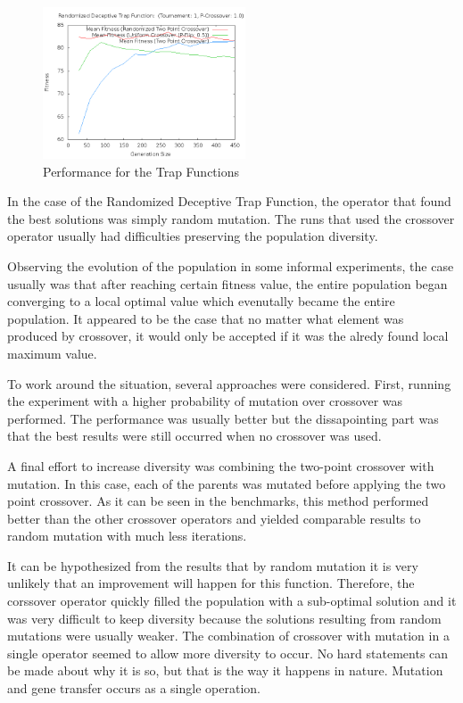 \documentclass[10pt]{article}
\begin{document}
\begin{figure}[h!]
    \includegraphics[height=170px]{img/RandomizedDeceptiveTrapFunctionCrossoverGens.png}
    \caption[Performance for the Trap Functions]{Performance for the Trap Functions}
\end{figure}

In the case of the Randomized Deceptive Trap Function, the operator that found the best solutions was simply random mutation. The runs that used the crossover operator usually had difficulties preserving the population diversity.

Observing the evolution of the population in some informal experiments, the case usually was that after reaching certain fitness value, the entire population began converging to a local optimal value which evenutally became the entire population. It appeared to be the case that no matter what element was produced by crossover, it would only be accepted if it was the alredy found local maximum value.

To work around the situation, several approaches were considered. First, running the experiment with a higher probability of mutation over crossover was performed. The performance was usually better but the dissapointing part was that the best results were still occurred when no crossover was used.

A final effort to increase diversity was combining the two-point crossover with mutation. In this case, each of the parents was mutated before applying the two point crossover. As it can be seen in the benchmarks, this method performed better than the other crossover operators and yielded comparable results to random mutation with much less iterations.

It can be hypothesized from the results that by random mutation it is very unlikely that an improvement will happen for this function. Therefore, the corssover operator quickly filled the population with a sub-optimal solution and it was very difficult to keep diversity because the solutions resulting from random mutations were usually weaker. The combination of crossover with mutation in a single operator seemed to allow more diversity to occur. No hard statements can be made about why it is so, but that is the way it happens in nature. Mutation and gene transfer occurs as a single operation.
\end{document}
